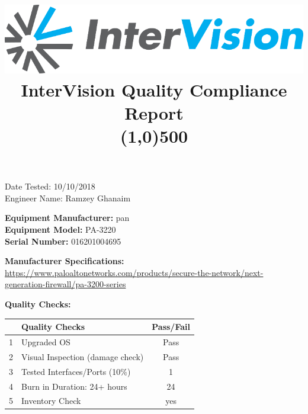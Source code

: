 \documentclass[12pt]{article}
\author{}
\title{\includegraphics[scale=1]{IV_logo.png}
\\InterVision Quality Compliance Report\\\line(1,0){500}\vspace{-8ex}}
\date{}
\begin{document}
\maketitle
\begin{flushright}
Date Tested: 10/10/2018\\
Engineer Name: Ramzey Ghanaim\\
\end{flushright}
\begin{flushleft}
\textbf{Equipment Manufacturer: } pan\\
\textbf{Equipment Model: } PA-3220\\
\textbf{Serial Number: } 016201004695\\
\end{flushleft}
\begin{flushleft}
\textbf{Manufacturer Specifications:} \\\url{https://www.paloaltonetworks.com/products/secure-the-network/next-generation-firewall/pa-3200-series} \\
\end{flushleft}
\begin{flushleft}
\textbf{Quality Checks:} 
\end{flushleft}
\begin{table}[H]
\centering
\begin{tabular}{|c|l|c|}
 \hline
& \textbf{Quality Checks}  & \textbf{Pass/Fail} \\ \hline
1& Upgraded OS & Pass \\ \hline
2& Visual Inspection (damage check) & Pass \\ \hline
3& Tested Interfaces/Ports (10\%) & 1 \\ \hline
4& Burn in Duration: 24+ hours & 24 \\ \hline
5& Inventory Check & yes \\ \hline
\end{tabular}
\end{table}
\end{document}
